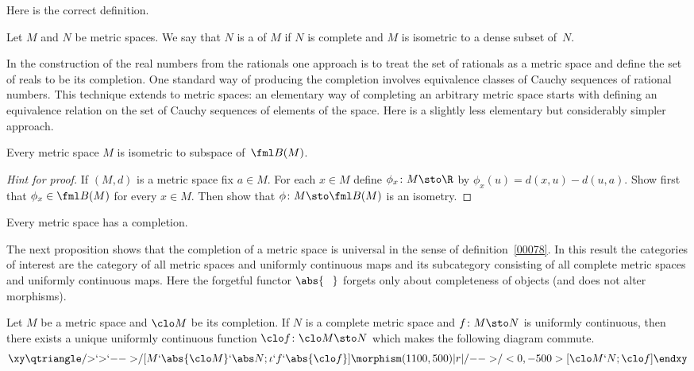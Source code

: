 Here is the correct definition.

\begin{defn}\label{C035511} Let $M$ and $N$ be metric spaces.  We say that $N$ is a
 of $M$ if $N$ is complete and $M$ is isometric to a dense subset of~$N$.
\end{defn}

In the construction of the real numbers from the rationals one approach is to treat the
set of rationals as a metric space and define the set of reals to be its completion. One
standard way of producing the completion involves equivalence classes of Cauchy sequences
of rational numbers. This technique extends to metric spaces: an elementary way of
completing an arbitrary metric space starts with defining an equivalence relation on the
set of Cauchy sequences of elements of the space.  Here is a slightly less elementary but
considerably simpler approach.

\begin{prop} Every metric space $M$ is isometric to subspace of~$\fml B(M)$.
\end{prop}

\begin{proof}[\emph{Hint for proof}] If $(M,d)$ is a metric space fix $a \in M$. For each
$x \in M$ define $\phi_x\colon M \sto \R$ by $\phi_x(u) = d(x,u) - d(u,a)$.  Show first
that $\phi_x \in \fml B(M)$ for every $x \in M$.  Then show that $\phi\colon M \sto \fml
B(M)$ is an isometry. \ns
\end{proof}

\begin{cor}\label{C035521} Every metric space has a completion.
\end{cor}

The next proposition shows that the completion of a metric space is universal in the sense of
definition~\ref{00078}.  In this result the categories of interest are the category of all metric spaces
and uniformly continuous maps and its subcategory consisting of all complete metric spaces and uniformly
continuous maps.  Here the forgetful functor $\abs{\hphantom{O}}$ forgets only about completeness of objects
(and does not alter morphisms).

\begin{prop}\label{C035557} Let $M$ be a metric space and $\clo M$ be its completion. If $N$
is a complete metric space and $f\colon M \sto N$ is uniformly continuous, then there
exists a unique uniformly continuous function $\clo f\colon \clo M \sto N$ which makes
the following diagram commute.
 \[\xy
     \qtriangle/{>}`{>}`{-->}/[M`\abs{\clo M}`\abs N;\iota`f`\abs{\clo f}]
     \morphism(1100,500)|r|/{-->}/<0,-500>[\clo M`N;\clo f]
   \endxy\]
\end{prop}

